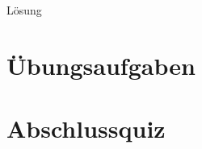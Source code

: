 \documentclass[
  ngerman,
]{book}
\begin{document}
Lösung

\hypertarget{section-175}{%
\subsubsection*{}\label{section-175}}

\hypertarget{uxfcbungsaufgaben-1}{%
\chapter{Übungsaufgaben}\label{uxfcbungsaufgaben-1}}

\hypertarget{abschlussquiz}{%
\chapter{Abschlussquiz}\label{abschlussquiz}}

  
\end{document}
